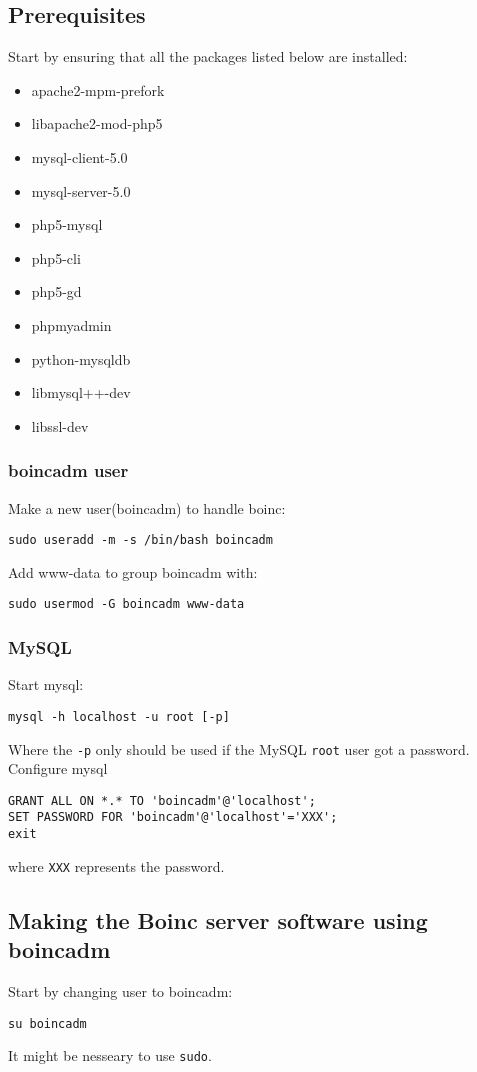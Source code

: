 \documentclass{article}
\begin{document}
\subsection{Prerequisites}
Start by ensuring that all the packages listed below are installed:
\begin{itemize}
\item apache2-mpm-prefork
\item libapache2-mod-php5
\item mysql-client-5.0
\item mysql-server-5.0
\item php5-mysql
\item php5-cli
\item php5-gd
\item phpmyadmin
\item python-mysqldb
\item libmysql++-dev
\item libssl-dev
\end{itemize}
%
\subsubsection{boincadm user}
Make a new user(boincadm) to handle boinc:
\begin{verbatim}	
sudo useradd -m -s /bin/bash boincadm
\end{verbatim}
%
Add www-data to group boincadm with:
\begin{verbatim}
sudo usermod -G boincadm www-data
\end{verbatim}
%
\subsubsection{MySQL}
Start mysql:
\begin{verbatim}
mysql -h localhost -u root [-p] 
\end{verbatim}
Where the \texttt{-p} only should be used if the MySQL \texttt{root} user got a password.
%
Configure mysql
\begin{verbatim}
GRANT ALL ON *.* TO 'boincadm'@'localhost';
SET PASSWORD FOR 'boincadm'@'localhost'='XXX'; 
exit 
\end{verbatim}
%
where \texttt{XXX} represents the password.
%
\subsection{Making the Boinc server software using boincadm}
Start by changing user to boincadm:
\begin{verbatim}
su boincadm
\end{verbatim}
It might be nesseary to use \texttt{sudo}.
\end{document}
